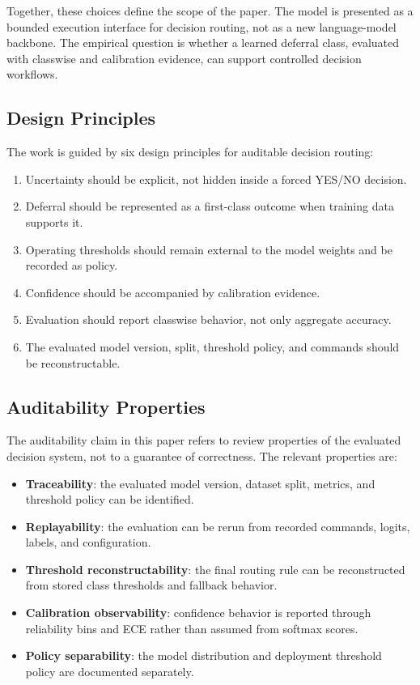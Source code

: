\documentclass[11pt]{article}
\begin{document}
Together, these choices define the scope of the paper. The model is presented as a bounded execution interface for decision routing, not as a new language-model backbone. The empirical question is whether a learned deferral class, evaluated with classwise and calibration evidence, can support controlled decision workflows.

\subsection{Design Principles}

The work is guided by six design principles for auditable decision routing:
\begin{enumerate}[leftmargin=1.5em]
  \item Uncertainty should be explicit, not hidden inside a forced YES/NO decision.
  \item Deferral should be represented as a first-class outcome when training data supports it.
  \item Operating thresholds should remain external to the model weights and be recorded as policy.
  \item Confidence should be accompanied by calibration evidence.
  \item Evaluation should report classwise behavior, not only aggregate accuracy.
  \item The evaluated model version, split, threshold policy, and commands should be reconstructable.
\end{enumerate}

\subsection{Auditability Properties}

The auditability claim in this paper refers to review properties of the evaluated decision system, not to a guarantee of correctness. The relevant properties are:
\begin{itemize}[leftmargin=1.5em]
  \item \textbf{Traceability}: the evaluated model version, dataset split, metrics, and threshold policy can be identified.
  \item \textbf{Replayability}: the evaluation can be rerun from recorded commands, logits, labels, and configuration.
  \item \textbf{Threshold reconstructability}: the final routing rule can be reconstructed from stored class thresholds and fallback behavior.
  \item \textbf{Calibration observability}: confidence behavior is reported through reliability bins and ECE rather than assumed from softmax scores.
  \item \textbf{Policy separability}: the model distribution and deployment threshold policy are documented separately.
\end{itemize}
\end{document}

